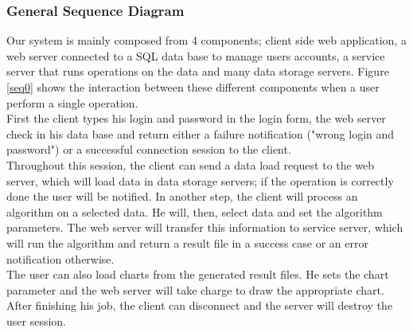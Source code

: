 \subsubsection{General Sequence Diagram}

Our system is mainly composed from 4 components; client side web application, a web server connected to a SQL data base to manage users accounts, a service server that runs operations on the data and many data storage servers. Figure \ref{seq0} shows the interaction between these different components when a user perform a single operation.\\

First the client types his login and password in the login form, the web server check in his data base and return either a failure notification ("wrong login and password") or a successful connection session to the client.\\

Throughout this session, the client can send a data load request to the web server, which will load data in data storage servers; if the operation is correctly done the user will be notified. In another step, the client will process an algorithm on a selected data. He will, then, select data and set the algorithm parameters. The web server will transfer this information to service server, which will run the algorithm and return a result file in a success case or an error notification otherwise. \\

The user can also load charts from the generated result files. He sets the chart parameter and the web server will take charge to draw the appropriate chart. \\

After finishing his job, the client can disconnect and the server will destroy the user session.\\


